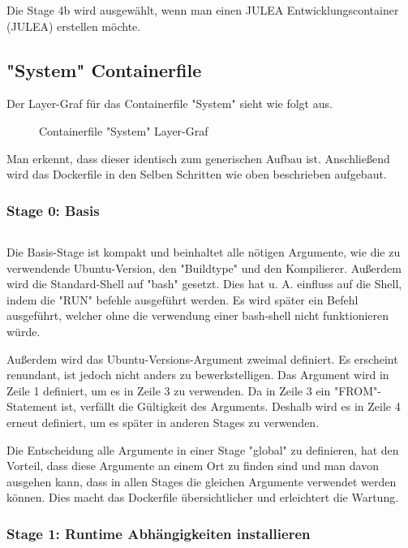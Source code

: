 Die Stage 4b wird ausgewählt, wenn man einen JULEA Entwicklungscontainer (JULEA) erstellen möchte.

\subsection{"System" Containerfile}

Der Layer-Graf für das Containerfile "System" sieht wie folgt aus. 
\begin{figure}[!htbp]
    \centering
    
    \caption{Containerfile "System" Layer-Graf}
\end{figure}
\FloatBarrier

Man erkennt, dass dieser identisch zum generischen Aufbau ist. Anschließend wird das Dockerfile in den Selben Schritten wie oben beschrieben aufgebaut.

\subsubsection{Stage 0: Basis}

\inputminted[firstline=0,lastline=7]{dockerfile}{./code-examples/Dockerfile.system}

Die Basis-Stage ist kompakt und beinhaltet alle nötigen Argumente, wie die zu verwendende Ubuntu-Version, den "Buildtype" und den Kompilierer. Außerdem wird die Standard-Shell auf "bash" gesetzt. Dies hat u. A. einfluss auf die Shell, indem die "RUN" befehle ausgeführt werden. Es wird später ein Befehl ausgeführt, welcher ohne die verwendung einer bash-shell nicht funktionieren würde.

Außerdem wird das Ubuntu-Versions-Argument zweimal definiert. Es erscheint renundant, ist jedoch nicht anders zu bewerkstelligen. Das Argument wird in Zeile 1 definiert, um es in Zeile 3 zu verwenden. Da in Zeile 3 ein "FROM"-Statement ist, verfällt die Gültigkeit des Arguments. Deshalb wird es in Zeile 4 erneut definiert, um es später in anderen Stages zu verwenden. 

Die Entscheidung alle Argumente in einer Stage "global" zu definieren, hat den Vorteil, dass diese Argumente an einem Ort zu finden sind und man davon ausgehen kann, dass in allen Stages die gleichen Argumente verwendet werden können. Dies macht das Dockerfile übersichtlicher und erleichtert die Wartung. 

\subsubsection{Stage 1: Runtime Abhängigkeiten installieren}


